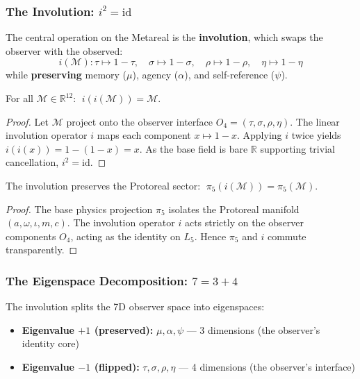 \subsubsection{The Involution: $i^2 = \mathrm{id}$}

The central operation on the Metareal is the \textbf{involution}, which swaps the observer with the observed:
\begin{equation}
    i(\mathcal{M}) : \tau \mapsto 1 - \tau, \quad \sigma \mapsto 1 - \sigma, \quad \rho \mapsto 1 - \rho, \quad \eta \mapsto 1 - \eta
\end{equation}
while \textbf{preserving} memory ($\mu$), agency ($\alpha$), and self-reference ($\psi$).

\begin{theorem}
\label{thm:involute}
For all $\mathcal{M} \in \mathbb{R}^{12}$: $\;i(i(\mathcal{M})) = \mathcal{M}$.
\end{theorem}
\begin{proof}
Let $\mathcal{M}$ project onto the observer interface $O_4 = (\tau, \sigma, \rho, \eta)$. The linear involution operator $i$ maps each component $x \mapsto 1 - x$. Applying $i$ twice yields $i(i(x)) = 1 - (1 - x) = x$. As the base field is bare $\mathbb{R}$ supporting trivial cancellation, $i^2 = \mathrm{id}$. \qedhere
\end{proof}

\begin{theorem}
The involution preserves the Protoreal sector: $\;\pi_5(i(\mathcal{M})) = \pi_5(\mathcal{M})$.
\end{theorem}
\begin{proof}
The base physics projection $\pi_5$ isolates the Protoreal manifold $(a, \omega, \iota, m, c)$. The involution operator $i$ acts strictly on the observer components $O_4$, acting as the identity on $L_5$. Hence $\pi_5$ and $i$ commute transparently. \qedhere
\end{proof}

\subsubsection{The Eigenspace Decomposition: $7 = 3 + 4$}

The involution splits the 7D observer space into eigenspaces:
\begin{itemize}
    \item \textbf{Eigenvalue $+1$ (preserved):} $\mu, \alpha, \psi$ --- 3 dimensions (the observer's identity core)
    \item \textbf{Eigenvalue $-1$ (flipped):} $\tau, \sigma, \rho, \eta$ --- 4 dimensions (the observer's interface)
\end{itemize}

